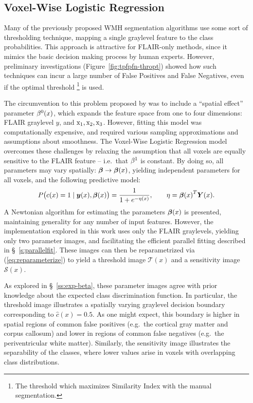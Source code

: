\subsection{Voxel-Wise Logistic Regression}
Many of the previously proposed WMH segmentation algorithms use some sort of thresholding technique,
mapping a single graylevel feature to the class probabilities.
This approach is attractive for FLAIR-only methods,
since it mimics the basic decision making process by human experts.
However, preliminary investigations (Figure~\ref{fig:tpfpfn-thropt}) showed how
such techniques can incur a large number of False Positives and False Negatives, 
even if the optimal threshold%
\footnote{The threshold which maximizes Similarity Index with the manual segmentation.}
is used.
\par
The circumvention to this problem proposed by \citeauthor{Schmidt2017a}
was to include a ``spatial effect'' parameter $\beta^0(x)$,
which expands the feature space from one to four dimensions:
FLAIR graylevel $y$, and $\mathrm{x}_1,\mathrm{x}_2,\mathrm{x}_3$.
However, fitting this model was computationally expensive,
and required various sampling approximations and assumptions about smoothness.
The Voxel-Wise Logistic Regression model overcomes these challenges
by relaxing the assumption that all voxels are equally sensitive to the FLAIR feature
-- i.e.\ that $\beta^1$ is constant.
By doing so, all parameters may vary spatially: $\bm{\beta} \rightarrow \bm{\beta}(x)$,
yielding independent parameters for all voxels,
and the following predictive model:
\begin{equation}
P\big(c(x)=1\mid\by(x),\bb(x)\big) = \frac{1}{1+e^{-\eta(x)}},\qquad\eta = {\bb(x)}^T\bm{Y}(x).%
\label{eq:eq:vlrmodel-conc}
\end{equation}
A Newtonian algorithm for estimating the parameters $\bm{\beta}(x)$ is presented,
maintaining generality for any number of input features.
However, the implementation explored in this work uses only the FLAIR graylevels,
yielding only two parameter images,
and facilitating the efficient parallel fitting described in \S~\ref{s:parallelfit}.
These images can then be reparametrized via (\ref{eq:reparameterize}) to yield
a threshold image $\mathcal{T}(x)$
and a sensitivity image $\mathcal{S}(x)$.
\par
As explored in \S~\ref{ss:exp-beta}, these parameter images
agree with prior knowledge about the expected class discrimination function.
In particular, the threshold image illustrates a spatially varying graylevel decision boundary
corresponding to $\hat{c}(x) = 0.5$.
As one might expect, this boundary is higher in spatial regions of common false positives
(e.g.\ the cortical gray matter and corpus callosum)
and lower in regions of common false negatives
(e.g.\ the periventricular white matter).
Similarly, the sensitivity image illustrates the separability of the classes,
where lower values arise in voxels with overlapping class distributions.
